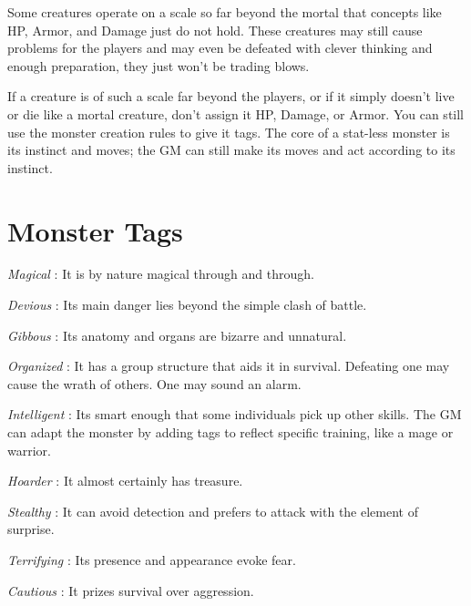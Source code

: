 Some creatures operate on a scale so far beyond the mortal that concepts like HP, Armor, and Damage just do not hold. These creatures may still cause problems for the players and may even be defeated with clever thinking and enough preparation, they just won't be trading blows.

       

If a creature is of such a scale far beyond the players, or if it simply doesn't live or die like a mortal creature, don't assign it HP, Damage, or Armor. You can still use the monster creation rules to give it tags. The core of a stat-less monster is its instinct and moves; the GM can still make its moves and act according to its instinct.

       
\section{Monster Tags}    
       

         {\em Magical} : It is by nature magical through and through.

       

         {\em Devious} : Its main danger lies beyond the simple clash of battle.

       

         {\em Gibbous} : Its anatomy and organs are bizarre and unnatural.

       

         {\em Organized} : It has a group structure that aids it in survival. Defeating one may cause the wrath of others. One may sound an alarm.

       

         {\em Intelligent} : Its smart enough that some individuals pick up other skills. The GM can adapt the monster by adding tags to reflect specific training, like a mage or warrior.

       

         {\em Hoarder} : It almost certainly has treasure.

       

         {\em Stealthy} : It can avoid detection and prefers to attack with the element of surprise.

       

         {\em Terrifying} : Its presence and appearance evoke fear.

       

         {\em Cautious} : It prizes survival over aggression.

